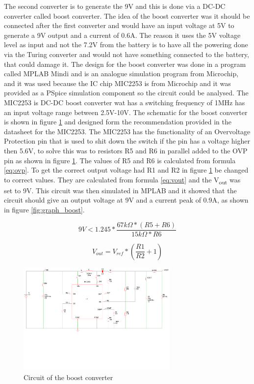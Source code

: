 \documentclass[11pt, titlepage]{article} %
\begin{document}
The second converter is to generate the 9V and this is done via a DC-DC converter called boost converter. The idea of the boost converter was it should be connected after the first converter and would have an input voltage at 5V to generate a 9V output and a current of 0.6A. The reason it uses the 5V voltage level as input and not the 7.2V from the battery is to have all the powering done via the Turing converter and would not have something connected to the battery, that could damage it. The design for the boost converter was done in a program called MPLAB Mindi and is an analogue simulation program from Microchip, and it was used because the IC chip MIC2253 is from Microchip and it was provided as a PSpice simulation component so the circuit could be analysed. The MIC2253 is DC-DC boost converter wat has a switching frequency of 1MHz has an input voltage range between 2.5V-10V. The schematic for the boost converter is shown in figure \ref{fig:circuit_boost_converter} and designed form the recommendation provided in the datasheet for the MIC2253. The MIC2253 has the functionality of an Overvoltage Protection pin that is used to shit down the switch if the pin has a voltage higher then 5.6V, to solve this was to resistors R5 and R6 in parallel added to the OVP pin as shown in figure \ref{fig:circuit_boost_converter}. The values of R5 and R6 is calculated from formula \ref{eq:ovp}. To get the correct output voltage had R1 and R2 in figure \ref{fig:circuit_boost_converter} be changed to correct values. They are calculated from formula \ref{eq:vout} and the V\textsubscript{out} was set to 9V. This circuit was then simulated in MPLAB and it showed that the circuit should give an output voltage at 9V and a current peak of 0.9A, as shown in figure \ref{fig:graph_boost}. 

\begin{equation}
	9V < 1.245 * \frac{67k \Omega * (R5 + R6) }{15k \Omega * R6}	
	\label{eq:ovp} 	
\end{equation}

\begin{equation}
	V_{out} = V_{ref} * (\frac{R1}{R2} + 1)
	\label{eq:vout}
\end{equation}



\begin{figure}
	\includegraphics[width=0.7\textwidth]{boost_converter_curcuit.pdf}
	\caption{Circuit of the boost converter}
	\label{fig:circuit_boost_converter}
	\centering
\end{figure}
\end{document}
